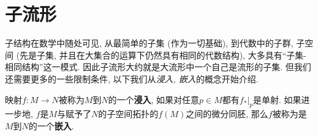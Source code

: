 \section{子流形}

子结构在数学中随处可见, 从最简单的子集 (作为一切基础), 到代数中的子群, 子空间 (先是子集, 并且在大集合的运算下仍然具有相同的代数结构), 大多具有``子集-相同结构''这一模式.
因此子流形大约就是大流形中一个自己是流形的子集.
但我们还需要更多的一些限制条件, 以下我们从\textit{浸入, 嵌入}的概念开始介绍.

\begin{defn}
    映射$f:M\to N$被称为$M$到$N$的一个\textbf{浸入}, 如果对任意$p\in M$都有$f_*|_p$是单射.
    如果进一步地, $f$是$M$与赋予了$N$的子空间拓扑的$f(M)$之间的微分同胚, 那么$f$被称为是$M$到$N$的一个\textbf{嵌入}.
\end{defn}

